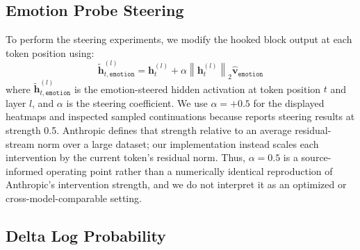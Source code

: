 \subsection{Emotion Probe Steering}

To perform the steering experiments, we modify the hooked block output at each token position using:
\begin{equation}
    \tilde{\mathbf{h}}_{t,\mathtt{emotion}}^{(l)}=\mathbf{h}_{t}^{(l)}+\alpha\left\lVert\mathbf{h}_{t}^{(l)}\right\rVert_2\mathbf{\hat{v}}_{\mathtt{emotion}}
    \label{eqtn:emotion-steering}
\end{equation}
where $\tilde{\mathbf{h}}_{t,\mathtt{emotion}}^{(l)}$ is the emotion-steered hidden activation at token position $t$ and layer $l$, 
and $\alpha$ is the steering coefficient. We use $\alpha=+0.5$ for the displayed heatmaps and inspected sampled continuations
because \cite{sofroniew_emotion_2026} reports steering results at
strength 0.5. Anthropic defines that strength relative to an average residual-stream norm over a large dataset; our implementation 
instead scales each intervention by the current token's residual norm. Thus, $\alpha=0.5$ is a source-informed operating point rather 
than a numerically identical reproduction of Anthropic's intervention strength, and we do not interpret it as an optimized or 
cross-model-comparable setting.

\subsection{Delta Log Probability}

